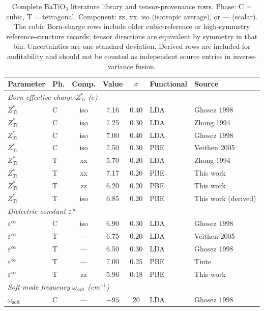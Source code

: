 \documentclass[onecolumn,superscriptaddress,amsmath,amssymb,longbibliography]{revtex4-2}
\begin{document}
\begin{table}[ht]
\centering
\footnotesize
\caption{Complete BaTiO$_3$ literature library and tensor-provenance rows.
Phase: C = cubic, T = tetragonal. Component: zz, xx, iso (isotropic average),
or --- (scalar). The cubic Born-charge rows include older cubic-reference or
high-symmetry reference-structure records; tensor directions are equivalent by
symmetry in that bin. Uncertainties are one standard deviation. Derived rows
are included for auditability and should not be counted as independent source
entries in inverse-variance fusion.}
\label{tab:si_full_library}
\begin{tabular}{llcccll}
\toprule
Parameter & Ph. & Comp. & Value & $\sigma$ & Functional & Source \\
\midrule
\multicolumn{7}{l}{\textit{Born effective charge $Z^*_{\mathrm{Ti}}$ ($e$)}} \\
$Z^*_{\mathrm{Ti}}$ & C & iso & 7.16 & 0.40 & LDA & Ghosez 1998 \\
$Z^*_{\mathrm{Ti}}$ & C & iso & 7.25 & 0.30 & LDA & Zhong 1994 \\
$Z^*_{\mathrm{Ti}}$ & C & iso & 7.00 & 0.40 & LDA & Ghosez 1998 \\
$Z^*_{\mathrm{Ti}}$ & C & iso & 7.50 & 0.30 & PBE & Veithen 2005 \\
$Z^*_{\mathrm{Ti}}$ & T & xx & 5.70 & 0.20 & LDA & Zhong 1994 \\
$Z^*_{\mathrm{Ti}}$ & T & xx & 7.17 & 0.20 & PBE & This work \\
$Z^*_{\mathrm{Ti}}$ & T & zz & 6.20 & 0.20 & PBE & This work \\
$Z^*_{\mathrm{Ti}}$ & T & iso & 6.85 & 0.20 & PBE & This work (derived) \\
\midrule
\multicolumn{7}{l}{\textit{Dielectric constant $\varepsilon^\infty$}} \\
$\varepsilon^\infty$ & C & iso & 6.90 & 0.30 & LDA & Ghosez 1998 \\
$\varepsilon^\infty$ & T & --- & 6.75 & 0.20 & LDA & Veithen 2005 \\
$\varepsilon^\infty$ & T & --- & 6.50 & 0.30 & LDA & Ghosez 1998 \\
$\varepsilon^\infty$ & T & --- & 7.00 & 0.25 & PBE & Tinte \cite{Tinte2003} \\
$\varepsilon^\infty$ & T & zz & 5.96 & 0.18 & PBE & This work \\
\midrule
\multicolumn{7}{l}{\textit{Soft-mode frequency $\omega_{\mathrm{soft}}$ (cm$^{-1}$)}} \\
$\omega_{\mathrm{soft}}$ & C & --- & $-95$ & 20 & LDA & Ghosez 1998 \\

\end{tabular}
\end{table}
\end{document}
